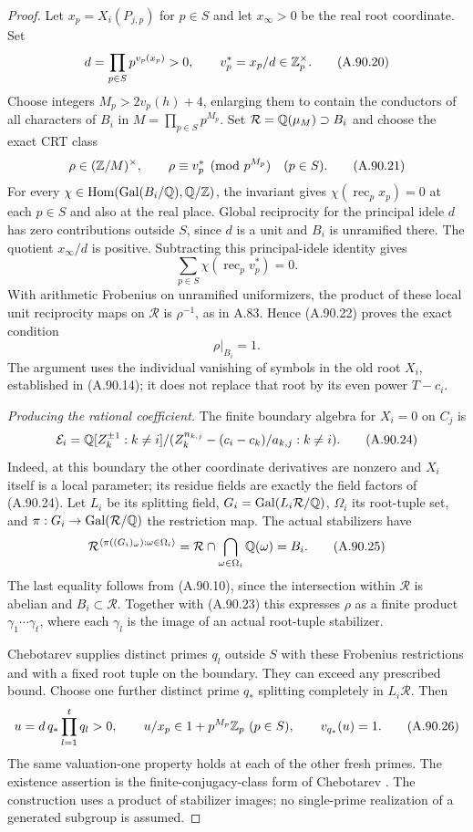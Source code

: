 \begin{proof}
Let $x_p=X_i(P_{j,p})$ for $p\in S$ and let
$x_\infty>0$ be the real root coordinate.
Set
\[
       d=\prod_{p\in S}p^{v_p(x_p)}>0,\qquad
       v_p^*=x_p/d\in\mathbb Z_p^\times .
 \tag{A.90.20}
\]
Choose integers $M_p>2v_p(h)+4$, enlarging them
to contain the conductors of all characters of
$B_i$ in
$M=\prod_{p\in S}p^{M_p}$.
Set $\mathcal R=\mathbb Q(\mu_M)\supset B_i$ and choose
the exact CRT class
\[
 \rho\in(\mathbb Z/M)^\times,\qquad
             \rho\equiv v_p^*\pmod {p^{M_p}}\quad(p\in S).
 \tag{A.90.21}
\]
For every $\chi\in\operatorname{Hom}
(\operatorname{Gal}(B_i/\mathbb Q),\mathbb Q/\mathbb Z)$,
the invariant gives
$\chi(\operatorname{rec}_p x_p)=0$ at each
$p\in S$ and also at the real place.
Global reciprocity for the principal idele $d$
has zero contributions outside $S$, since $d$
is a unit and $B_i$ is unramified there.
The quotient $x_\infty/d$ is positive.
Subtracting this principal-idele identity gives
\[
 \sum_{p\in S}\chi(\operatorname{rec}_p v_p^*)=0.
 \tag{A.90.22}
\]
With arithmetic Frobenius on unramified
uniformizers, the product of these local unit
reciprocity maps on $\mathcal R$ is $\rho^{-1}$,
as in A.83.
Hence (A.90.22) proves the exact condition
\[
                         \rho|_{B_i}=1.
 \tag{A.90.23}
\]
The argument uses the individual vanishing of
symbols in the old root $X_i$, established in
(A.90.14); it does not replace that root by its
even power $T-c_i$.

\emph{Producing the rational coefficient.}
The finite boundary algebra for $X_i=0$ on
$C_j$ is
\[
 \mathcal E_i=
 \mathbb Q[Z_k^{\pm1}:k\ne i]/
       (Z_k^{n_{k,j}}-(c_i-c_k)/a_{k,j}:k\ne i).
 \tag{A.90.24}
\]
Indeed, at this boundary the other coordinate
derivatives are nonzero and $X_i$ itself is a
local parameter; its residue fields are exactly
the field factors of (A.90.24).
Let $L_i$ be its splitting field,
$G_i=\operatorname{Gal}(L_i\mathcal R/\mathbb Q)$,
$\Omega_i$ its root-tuple set, and
$\pi:G_i\to\operatorname{Gal}(\mathcal R/\mathbb Q)$
the restriction map.
The actual stabilizers have
\[
 \mathcal R^{\langle\pi((G_i)_\omega):
                                      \omega\in\Omega_i\rangle}
  =\mathcal R\cap\bigcap_{\omega\in\Omega_i}\mathbb Q(\omega)
  =B_i .
 \tag{A.90.25}
\]
The last equality follows from (A.90.10), since
the intersection within $\mathcal R$ is abelian
and $B_i\subset\mathcal R$.
Together with (A.90.23) this expresses $\rho$ as
a finite product $\gamma_1\cdots\gamma_t$,
where each $\gamma_l$ is the image of an actual
root-tuple stabilizer.

Chebotarev supplies distinct primes $q_l$
outside $S$ with these Frobenius restrictions
and with a fixed root tuple on the boundary.
They can exceed any prescribed bound.
Choose one further distinct prime $q_*$ splitting
completely in $L_i\mathcal R$.
Then
\[
          u=d\,q_*\prod_{l=1}^tq_l>0,\qquad
          u/x_p\in1+p^{M_p}\mathbb Z_p\ (p\in S),
          \qquad v_{q_*}(u)=1.
 \tag{A.90.26}
\]
The same valuation-one property holds at each
of the other fresh primes.
The existence assertion is the finite-conjugacy-class
form of Chebotarev
\cite[Theorem 8.31]{AgentMilneANT}.
The construction uses a product of stabilizer
images; no single-prime realization of a
generated subgroup is assumed.


\end{proof}
